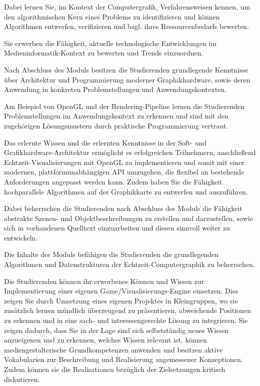 Dabei lernen Sie, im Kontext der Computergrafik, Verfahrensweisen
kennen, um den algorithmischen Kern eines Problems zu identifizieren und
können Algorithmen entwerfen, verifizieren und bzgl. ihres
Ressourcenbedarfs bewerten.

Sie erwerben die Fähigkeit, aktuelle technologische Entwicklungen im
Medieninformatik-Kontext zu bewerten und Trends einzuordnen.

Nach Abschluss des Moduls besitzen die Studierenden grundlegende
Kenntnisse über Architektur und Programmierung moderner Graphikhardware,
sowie deren Anwendung in konkreten Problemstellungen und
Anwendungskontexten.

Am Beispiel von OpenGL und der Rendering-Pipeline lernen die
Studierenden Problemstellungen im Anwendungskontext zu erkennen und sind
mit den zugehörigen Lösungsmustern durch praktische Programmierung
vertraut.

Das erlernte Wissen und die erlernten Kenntnisse in der Soft- und
Grafikhardware-Architektur ermöglicht es erfolgreichen Teilnehmern,
anschließend Echtzeit-Visualisierungen mit OpenGL zu implementieren und
somit mit einer modernen, plattformunabhängigen API umzugehen, die
flexibel an bestehende Anforderungen angepasst werden kann. Zudem haben
Sie die Fähigkeit hochparallele Algorithmen auf der Graphikkarte zu
entwerfen und auszuführen.

Dabei beherrschen die Studierenden nach Abschluss des Moduls die
Fähigkeit abstrakte Szenen- und Objektbeschreibungen zu erstellen und
darzustellen, sowie sich in vorhandenen Quelltext einzuarbeiten und
diesen sinnvoll weiter zu entwickeln.

Die Inhalte des Moduls befähigen die Studierenden die grundlegenden
Algorithmen und Datenstrukturen der Echtzeit-Computergraphik zu
beherrschen.

Die Studierenden können ihr erworbenes Können und Wissen zur
Implementierung einer eigenen Game/Visualisierungs-Engine einsetzen.
Dies zeigen Sie durch Umsetzung eines eigenen Projektes in Kleingruppen,
wo sie zusätzlich lernen mündlich überzeugend zu präsentieren,
abweichende Positionen zu erkennen und in eine sach- und
interessengerechte Lösung zu integrieren. Sie zeigen dadurch, dass Sie
in der Lage sind sich selbstständig neues Wissen anzueigenen und zu
erkennen, welches Wissen relevant ist, können mediengestalterische
Grundkompetenzen anwenden und besitzen aktive Vokabularien zur
Beschreibung und Realisierung angemessener Konzeptionen. Zudem können
sie die Realisationen bezüglich der Zielsetzungen kritisch diskutieren.


